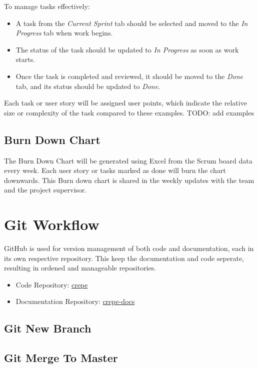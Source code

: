 \documentclass{projdoc}
\begin{document}
\noindent
To manage tasks effectively:
\begin{itemize}
	\item A task from the \emph{Current Sprint} tab should be selected and moved to the \emph{In Progress} tab when work begins. 
	\item The status of the task should be updated to \emph{In Progress} as soon as work starts.
	\item Once the task is completed and reviewed, it should be moved to the \emph{Done} tab, and its status should be updated to \emph{Done}.
\end{itemize}

\noindent
Each task or user story will be assigned user points, which indicate the relative size or complexity of the task compared to these examples.
TODO: add examples

\subsection{Burn Down Chart}
The Burn Down Chart will be generated using Excel from the Scrum board data every week.
Each user story or tasks marked as done will burn the chart downwards.
This Burn down chart is shared in the weekly updates with the team and the project supervisor.
\newpage

\section{Git Workflow}

GitHub is used for version management of both code and documentation, each in its own respective repository.
This keep the documentation and code seperate, resulting in ordened and manageable repositories. 

\begin{itemize}
	\item Code Repository: \href{https://github.com/lonkaars/crepe}{crepe}
	\item Documentation Repository: \href{https://github.com/lonkaars/crepe-docs}{crepe-docs}
\end{itemize}

\subsection{Git New Branch}
\subsection{Git Merge To Master}
\newpage
\end{document}
